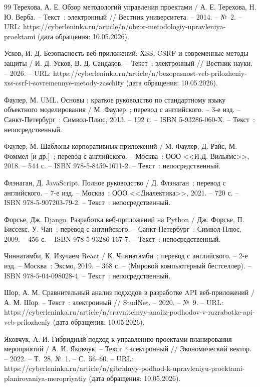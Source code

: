 \begin{thebibliography}{99}
	 Терехова, А. Е. Обзор методологий управления проектами / А. Е. Терехова, Н. Ю. Верба. -- Текст~: электронный // Вестник университета. -- 2014. -- №~2. -- URL: https://cyberleninka.ru/article/n/obzor-metodologiy-upravleniya-proektami (дата обращения: 10.05.2026).

	 Усков, И. Д. Безопасность веб-приложений: XSS, CSRF и современные методы защиты / И. Д. Усков, В. Д. Сандаков. -- Текст~: электронный // Вестник науки. -- 2026. -- URL: https://cyberleninka.ru/article/n/bezopasnost-veb-prilozheniy-xss-csrf-i-sovremennye-metody-zaschity (дата обращения: 10.05.2026).

	 Фаулер, М. UML. Основы : краткое руководство по стандартному языку объектного моделирования / М. Фаулер~; перевод с английского. -- 3-е изд. -- Санкт-Петербург~: Символ-Плюс, 2013. -- 192 с. -- ISBN 5-93286-060-X. -- Текст~: непосредственный.

	 Фаулер, М. Шаблоны корпоративных приложений / М. Фаулер, Д. Райс, М. Фоммел [и др.]~; перевод с английского. -- Москва~: ООО <<И.Д. Вильямс>>, 2018. -- 544 с. -- ISBN 978-5-8459-1611-2. -- Текст~: непосредственный.

	 Флэнаган, Д. JavaScript. Полное руководство / Д. Флэнаган~; перевод с английского. -- 7-е изд. -- Москва~: ООО <<Диалектика>>, 2021. -- 720 с. -- ISBN 978-5-907203-79-2. -- Текст~: непосредственный.

	 Форсье, Дж. Django. Разработка веб-приложений на Python / Дж. Форсье, П. Биссекс, У. Чан~; перевод с английского. -- Санкт-Петербург~: Символ-Плюс, 2009. -- 456 с. -- ISBN 978-5-93286-167-7. -- Текст~: непосредственный.

	 Чиннатамби, К. Изучаем React / К. Чиннатамби~; перевод с английского. -- 2-е изд. -- Москва~: Эксмо, 2019. -- 368 с. -- (Мировой компьютерный бестселлер). -- ISBN 978-5-04-098028-4. -- Текст~: непосредственный.

	 Шор, А. М. Сравнительный анализ подходов в разработке API веб-приложений / А. М. Шор. -- Текст~: электронный // StudNet. -- 2020. -- №~9. -- URL: https://cyberleninka.ru/article/n/sravnitelnyy-analiz-podhodov-v-razrabotke-api-veb-prilozheniy (дата обращения: 10.05.2026).

	 Яковчук, А. И. Гибридный подход к управлению проектами планирования мероприятий / А. И. Яковчук. -- Текст~: электронный // Экономический вектор. -- 2022. -- Т.~28, №~1. -- С.~56--60. -- URL: https://cyberleninka.ru/article/n/gibridnyy-podhod-k-upravleniyu-proektami-planirovaniya-meropriyatiy (дата обращения: 10.05.2026).


\end{thebibliography}
